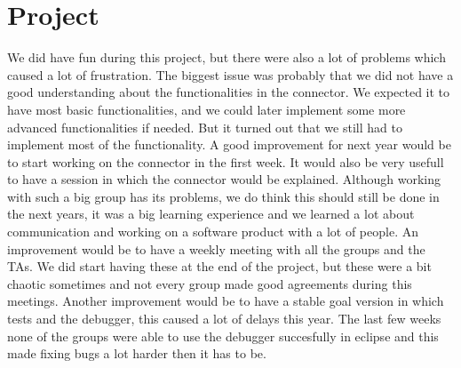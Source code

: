 \section {Project}
We did have fun during this project, but there were also a lot of problems which caused a lot of frustration. The biggest issue was probably that we did not have a good understanding about the functionalities in the connector. We expected it to have most basic functionalities, and we could later implement some more advanced functionalities if needed. But it turned out that we still had to implement most of the functionality. A good improvement for next year would be to start working on the connector in the first week. It would also be very usefull to have a session in which the connector would be explained. Although working with such a big group has its problems, we do think this should still be done in the next years, it was a big learning experience and we learned a lot about communication and working on a software product with a lot of people. An improvement would be to have a weekly meeting with all the groups and the TAs. We did start having these at the end of the project, but these were a bit chaotic sometimes and not every group made good agreements during this meetings. Another improvement would be to have a stable goal version in which tests and the debugger, this caused a lot of delays this year. The last few weeks none of the groups were able to use the debugger succesfully in eclipse and this made fixing bugs a lot harder then it has to be.